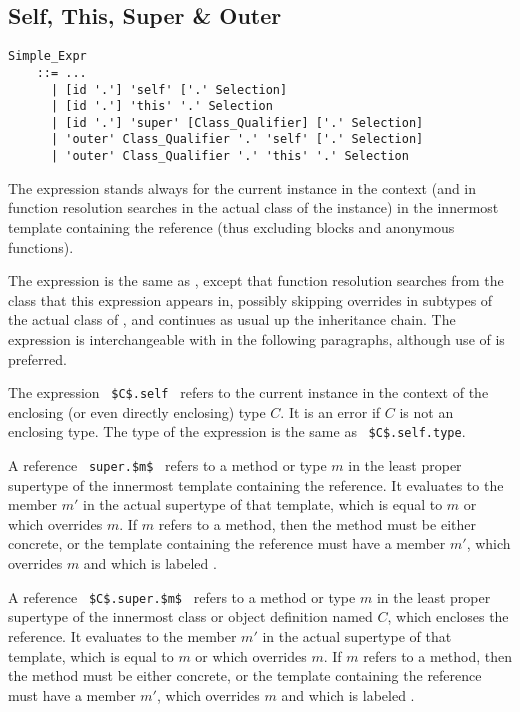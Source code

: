 \subsection{Self, This, Super \& Outer}
\label{sec:self-this-super}

\grammar\begin{lstlisting}
Simple_Expr 
    ::= ...
      | [id '.'] 'self' ['.' Selection]
      | [id '.'] 'this' '.' Selection
      | [id '.'] 'super' [Class_Qualifier] ['.' Selection]
      | 'outer' Class_Qualifier '.' 'self' ['.' Selection]
      | 'outer' Class_Qualifier '.' 'this' '.' Selection
\end{lstlisting}

The expression  stands always for the current instance in the context (and in function resolution searches in the actual class of the instance) in the innermost template containing the reference (thus excluding blocks and anonymous functions). 

The expression  is the same as , except that function resolution searches from the class that this expression appears in, possibly skipping overrides in subtypes of the actual class of , and continues as usual up the inheritance chain. The  expression is interchangeable with  in the following paragraphs, although use of  is preferred. 

The expression ~\lstinline!$C$.self!~ refers to the current instance in the context of the enclosing (or even directly enclosing) type $C$. It is an error if $C$ is not an enclosing type. The type of the expression is the same as ~\lstinline!$C$.self.type!. 

A reference ~\lstinline!super.$m$!~ refers to a method or type $m$ in the least proper supertype of the innermost template containing the reference. It evaluates to the member $m'$ in the actual supertype of that template, which is equal to $m$ or which overrides $m$. If $m$ refers to a method, then the method must be either concrete, or the template containing the reference must have a member $m'$, which overrides $m$ and which is labeled . 

A reference ~\lstinline!$C$.super.$m$!~ refers to a method or type $m$ in the least proper supertype of the innermost class or object definition named $C$, which encloses the reference. It evaluates to the member $m'$ in the actual supertype of that template, which is equal to $m$ or which overrides $m$. If $m$ refers to a method, then the method must be either concrete, or the template containing the reference must have a member $m'$, which overrides $m$ and which is labeled . 

